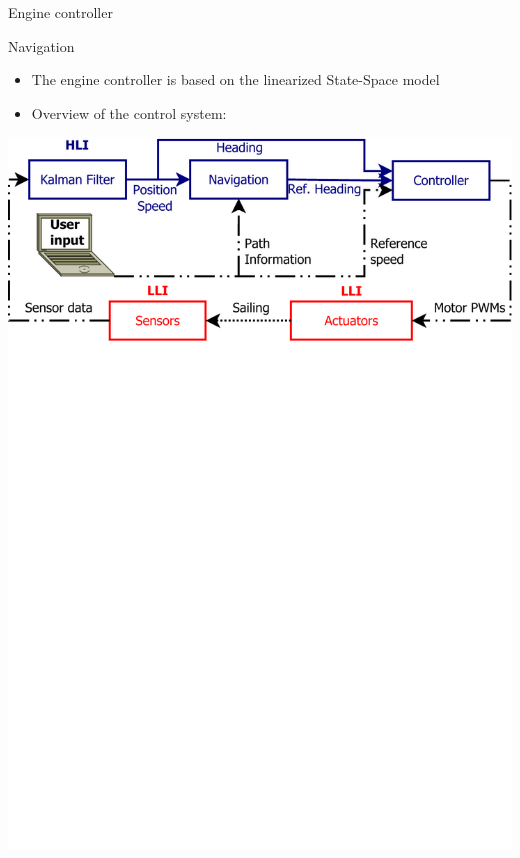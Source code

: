 \begin{frame}{Engine controller}
    \begin{block}{Navigation}
		\begin{itemize}
			\item The engine controller is based on the linearized State-Space model
			\item Overview of the control system:
		\end{itemize}
		\includegraphics[trim = 0mm 21cm 0mm 0mm, clip, width=\textwidth]{control/img/controlloop}
    \end{block}
\end{frame}

